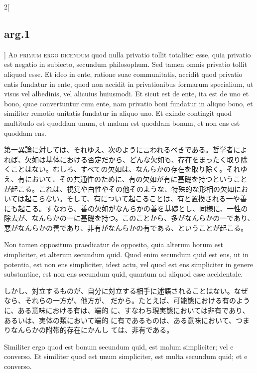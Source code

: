 \documentclass[paper=a4paper,fontsize=10pt,jafontsize=9pt,titlepage]{jlreq}
\begin{document}
\begin{paracol}{2}[\subsection{arg.1}]
{\scshape Ad primum ergo dicendum} quod nulla privatio tollit totaliter esse, quia
privatio est negatio in subiecto, secundum philosophum. Sed tamen omnis
privatio tollit aliquod esse. Et ideo in ente, ratione suae
communitatis, accidit quod privatio entis fundatur in ente, quod non
accidit in privationibus formarum specialium, ut visus vel albedinis,
vel alicuius huiusmodi. Et sicut est de ente, ita est de uno et bono,
quae convertuntur cum ente, nam privatio boni fundatur in aliquo bono,
et similiter remotio unitatis fundatur in aliquo uno. Et exinde
contingit quod multitudo est quoddam unum, et malum est quoddam bonum,
et non ens est quoddam ens.

\switchcolumn

第一異論に対しては、それゆえ、次のように言われるべきである。哲学者によ
れば、欠如は基体における否定だから、どんな欠如も、存在をまったく取り除
くことはない。むしろ、すべての欠如は、なんらかの存在を取り除く。それゆ
え、有において、その共通性のために、有の欠如が有に基礎を持つということ
が起こる。これは、視覚や白性やその他そのような、特殊的な形相の欠如にお
いては起こらない。そして、有について起こることは、有と置換される一や善
にも起こる。すなわち、善の欠如がなんらかの善を基礎とし、同様に、一性の
除去が、なんらかの一に基礎を持つ。このことから、多がなんらかの一であり、
悪がなんらかの善であり、非有がなんらかの有である、ということが起こる。

\switchcolumn*

Non tamen oppositum praedicatur de opposito,
quia alterum horum est simpliciter, et alterum secundum quid. Quod enim
secundum quid est ens, ut in potentia, est non ens simpliciter, idest
actu, vel quod est ens simpliciter in genere substantiae, est non ens
secundum quid, quantum ad aliquod esse accidentale.

\switchcolumn

しかし、対立するものが、自分に対立する相手に述語されることはない。なぜ
なら、それらの一方が、他方が、
だから。たとえば、可能態における有のように、ある意味における有は、端的
に、すなわち現実態においては非有であり、あるいは、実体の類において端的
に有であるものは、ある意味において、つまりなんらかの附帯的存在にかんし
ては、非有である。

\switchcolumn*

Similiter ergo quod
est bonum secundum quid, est malum simpliciter; vel e converso. Et
similiter quod est unum simpliciter, est multa secundum quid; et e
converso.

\switchcolumn


\end{paracol}
\end{document}
